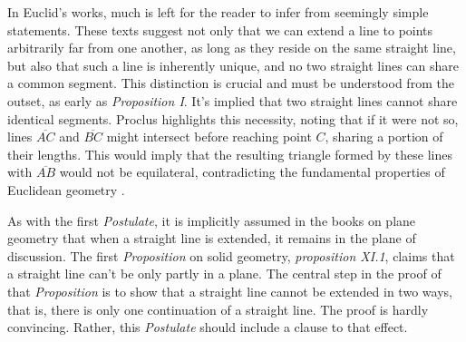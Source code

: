 In Euclid's works, much is left for the reader to infer from seemingly simple statements. These texts suggest not only that we can extend a line to points arbitrarily far from one another, as long as they reside on the same straight line, but also that such a line is inherently unique, and no two straight lines can share a common segment. This distinction is crucial and must be understood from the outset, as early as \textit{Proposition I}. It's implied that two straight lines cannot share identical segments. Proclus highlights this necessity, noting that if it were not so, lines $\overline{AC}$ and $\overline{BC}$ might intersect before reaching point $C$, sharing a portion of their lengths. This would imply that the resulting triangle formed by these lines with $\overline{AB}$ would not be equilateral, contradicting the fundamental properties of Euclidean geometry .

As with the first \textit{Postulate}, it is implicitly assumed in the books on plane geometry that when a straight line is extended, it remains in the plane of discussion. The first \textit{Proposition} on solid geometry, \textit{proposition XI.1}, claims that a straight line can’t be only partly in a plane. The central step in the proof of that \textit{Proposition} is to show that a straight line cannot be extended in two ways, that is, there is only one continuation of a straight line. The proof is hardly convincing. Rather, this \textit{Postulate} should include a clause to that effect.

\clearpage